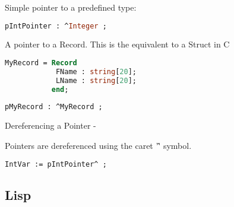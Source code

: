 \documentclass[12pt]{book}
\begin{document}
Simple pointer to a predefined type:

\lstset{style=mystyle}
\begin{lstlisting}[language=Pascal, caption=Pascal example]
pIntPointer : ^Integer ;
\end{lstlisting}


A pointer to a Record. This is the equivalent to a Struct in C

\lstset{style=mystyle}
\begin{lstlisting}[language=Pascal, caption=Pascal example]
MyRecord = Record
            FName : string[20];
            LName : string[20];
           end;
           
pMyRecord : ^MyRecord ;
\end{lstlisting}


Dereferencing a Pointer -

Pointers are dereferenced using the caret '\^' symbol.

\lstset{style=mystyle}
\begin{lstlisting}[language=Pascal, caption=Pascal example]
IntVar := pIntPointer^ ;
\end{lstlisting}



\subsection{Lisp}


\lstset{style=mystyle}
\begin{lstlisting}[language=Lisp, caption=Lisp example]

\end{lstlisting}
\end{document}
